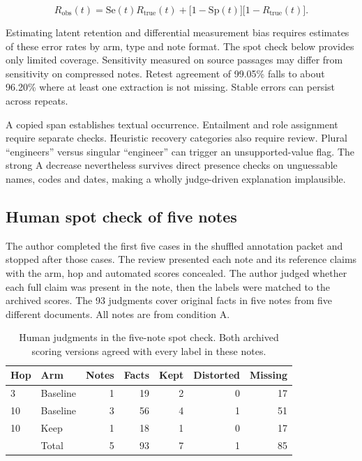 \documentclass[10pt,letterpaper]{amsart}
\numberwithin{equation}{section}
\begin{document}
\begin{equation}
  \label{eq:measurement}
  R_{\mathrm{obs}}(t) = \mathrm{Se}(t) R_{\mathrm{true}}(t)
    + \bigl[1 - \mathrm{Sp}(t)\bigr]\bigl[1 - R_{\mathrm{true}}(t)\bigr].
\end{equation}

Estimating latent retention and differential measurement bias requires estimates of
these error rates by arm, type and note format. The spot check below provides only
limited coverage. Sensitivity measured on source passages may differ from sensitivity
on compressed notes. Retest agreement of 99.05\% falls to about 96.20\% where at least one
extraction is not missing. Stable errors can persist across repeats.

A copied span establishes textual occurrence. Entailment and role assignment require
separate checks. Heuristic recovery categories also require review. Plural ``engineers''
versus singular ``engineer'' can trigger an unsupported-value flag. The strong A decrease
nevertheless survives direct presence checks on unguessable names, codes and dates, making
a wholly judge-driven explanation implausible.

\subsection*{Human spot check of five notes}

The author completed the first five cases in the shuffled annotation packet and stopped
after those cases. The review presented each note and its reference claims with the arm,
hop and automated scores concealed. The author judged whether each full claim was present
in the note, then the labels were matched to the archived scores. The 93 judgments cover
original facts in five notes from five different documents. All notes are from condition A.

\begin{table}[!htbp]
  \centering
  \small
  \caption{Human judgments in the five-note spot check. Both archived scoring versions
    agreed with every label in these notes.}
  \label{tab:human-spot-check}
  \begin{tabular}{@{}llrrrrr@{}}
    \toprule
    \textbf{Hop} & \textbf{Arm} & \textbf{Notes} & \textbf{Facts}
      & \textbf{Kept} & \textbf{Distorted} & \textbf{Missing} \\
    \midrule
    3 & Baseline & 1 & 19 & 2 & 0 & 17 \\
    10 & Baseline & 3 & 56 & 4 & 1 & 51 \\
    10 & Keep & 1 & 18 & 1 & 0 & 17 \\
    \midrule
    & Total & 5 & 93 & 7 & 1 & 85 \\
    \bottomrule
  \end{tabular}
\end{table}
\end{document}
